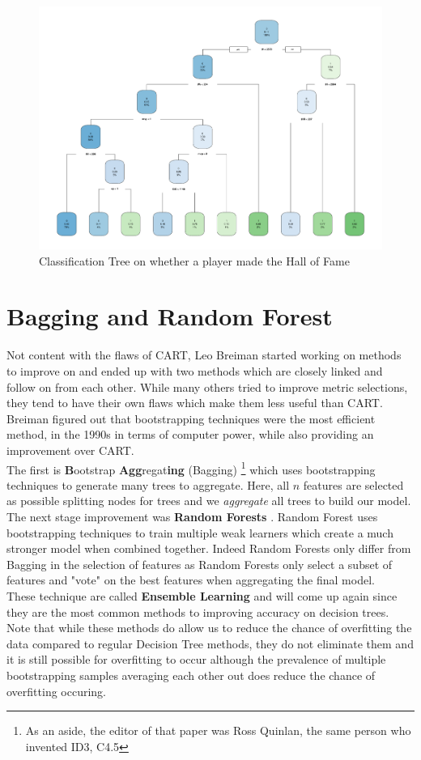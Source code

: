 \documentclass[11pt,a4paper]{report}
\begin{document}
\begin{figure}[ht]
    \centering
    \includegraphics[width = 12cm]{photographs/hofclass.pdf}
    \caption{Classification Tree on whether a player made the Hall of Fame}
    \label{fig:hof}
\end{figure}

\chapter{Bagging and Random Forest}
Not content with the flaws of CART, Leo Breiman started working on methods to improve on and ended up with two methods which are closely linked and follow on from each other. While many others tried to improve metric selections, they tend to have their own flaws which make them less useful than CART. Breiman figured out that bootstrapping techniques \cite{bootstrap} were the most efficient method, in the 1990s in terms of computer power, while also providing an improvement over CART.
\bigskip\\
The first is \textbf{B}ootstrap \textbf{Agg}regat\textbf{ing} (Bagging) \cite{bagging} \footnote{As an aside, the editor of that paper was Ross Quinlan, the same person who invented ID3, C4.5} which uses bootstrapping techniques to generate many trees to aggregate. Here, all $n$ features are selected as possible splitting nodes for trees and we \textit{aggregate} all trees to build our model.
\medskip\\
The next stage improvement was \textbf{Random Forests} \cite{randomforest}.
Random Forest uses bootstrapping techniques to train multiple weak learners which create a much stronger model when combined together.
Indeed Random Forests only differ from Bagging in the selection of features as Random Forests only select a subset of features and "vote" on the best features when aggregating the final model.
\bigskip\\
These technique are called \textbf{Ensemble Learning} and will come up again since they are the most common methods to improving accuracy on decision trees.
Note that while these methods do allow us to reduce the chance of overfitting the data compared to regular Decision Tree methods, they do not eliminate them and it is still possible for overfitting to occur although the prevalence of multiple bootstrapping samples averaging each other out does reduce the chance of overfitting occuring.
\end{document}

